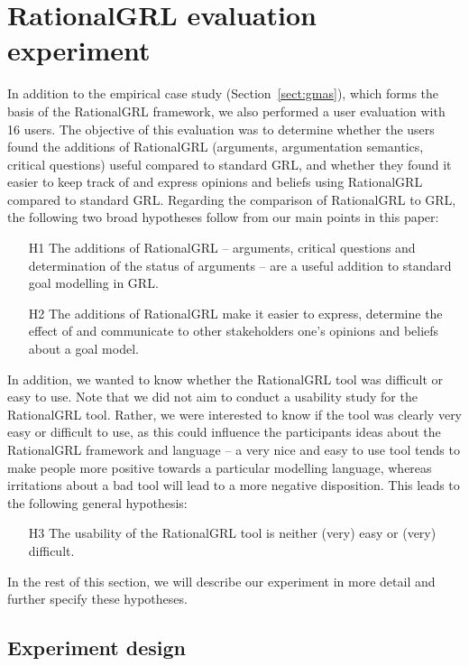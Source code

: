 \section{RationalGRL evaluation experiment}
\label{sect:validation}

In addition to the empirical case study (Section~\ref{sect:gmas}), which forms the basis of the RationalGRL framework, we also performed a user evaluation with 16 users. The objective of this evaluation was to determine whether the users found the additions of RationalGRL (arguments, argumentation semantics, critical questions) useful compared to standard GRL, and whether they found it easier to keep track of and express opinions and beliefs using RationalGRL compared to standard GRL. Regarding the comparison of RationalGRL to GRL, the following two broad hypotheses follow from our main points in this paper:

\begin{itemize}
\item[H1] The additions of RationalGRL -- arguments, critical questions and determination of the status of arguments -- are a useful addition to standard goal modelling in GRL.
\item[H2] The additions of RationalGRL make it easier to express, determine the effect of and communicate to other stakeholders one's opinions and beliefs about a goal model.
\end{itemize}

In addition, we wanted to know whether the RationalGRL tool was difficult or easy to use. Note that we did not aim to conduct a usability study for the RationalGRL tool. Rather, we were interested to know if the tool was clearly very easy or difficult to use, as this could influence the participants ideas about the RationalGRL framework and language -- a very nice and easy to use tool tends to make people more positive towards a particular modelling language, whereas irritations about a bad tool will lead to a more negative disposition. This leads to the following general hypothesis:

\begin{itemize}
\item[H3] The usability of the RationalGRL tool is neither (very) easy or (very) difficult. 
\end{itemize}

In the rest of this section, we will describe our experiment in more detail and further specify these hypotheses.

\subsection{Experiment design}

